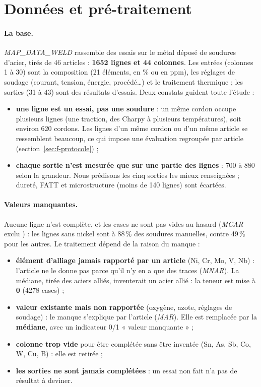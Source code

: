 \section{Données et pré-traitement}

\paragraph{La base.} \emph{MAP\_DATA\_WELD} \cite{mapweld,cool1996,cool1997} rassemble
des essais sur le métal déposé de soudures d'acier, tirés de 46 articles :
\textbf{1652 lignes et 44 colonnes}. Les entrées (colonnes 1 à 30) sont la composition
(21 éléments, en \% ou en ppm), les réglages de soudage (courant, tension, énergie,
procédé…) et le traitement thermique ; les sorties (31 à 43) sont des résultats
d'essais. Deux constats guident toute l'étude :
\begin{itemize}
  \item \textbf{une ligne est un essai, pas une soudure} : un même cordon occupe
    plusieurs lignes (une traction, des Charpy à plusieurs températures), soit environ
    620 cordons. Les lignes d'un même cordon ou d'un même article se ressemblent
    beaucoup, ce qui impose une évaluation regroupée par article
    (section~\ref{sec:f-protocole}) ;
  \item \textbf{chaque sortie n'est mesurée que sur une partie des lignes} : 700 à 880
    selon la grandeur. Nous prédisons les cinq sorties les mieux renseignées ; dureté,
    FATT et microstructure (moins de 140 lignes) sont écartées.
\end{itemize}

\paragraph{Valeurs manquantes.} Aucune ligne n'est complète, et les cases ne sont pas
vides au hasard (\emph{MCAR} exclu \cite{rubin1976}) : les lignes sans nickel sont à
88\,\% des soudures manuelles, contre 49\,\% pour les autres. Le traitement dépend de la
raison du manque :
\begin{itemize}
  \item \textbf{élément d'alliage jamais rapporté par un article} (Ni, Cr, Mo, V, Nb) :
    l'article ne le donne pas parce qu'il n'y en a que des traces (\emph{MNAR}). La
    médiane, tirée des aciers alliés, inventerait un acier allié : la teneur est mise à
    \textbf{0} (4278 cases) ;
  \item \textbf{valeur existante mais non rapportée} (oxygène, azote, réglages de
    soudage) : le manque s'explique par l'article (\emph{MAR}). Elle est remplacée par la
    \textbf{médiane}, avec un indicateur 0/1 « valeur manquante » ;
  \item \textbf{colonne trop vide} pour être complétée sans être inventée (Sn, As, Sb,
    Co, W, Cu, B) : elle est retirée ;
  \item \textbf{les sorties ne sont jamais complétées} : un essai non fait n'a pas de
    résultat à deviner.
\end{itemize}

